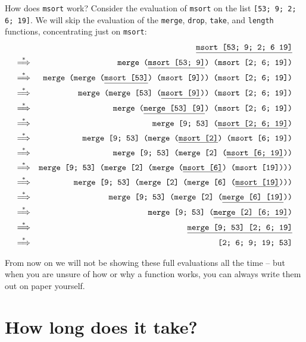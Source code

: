 \documentclass[]{book}
\begin{document}
How does \texttt{msort} work? Consider the evaluation of \texttt{msort} on the list \texttt{[53; 9; 2; 6; 19]}. We will skip the evaluation of the \texttt{merge}, \texttt{drop}, \texttt{take}, and \texttt{length} functions, concentrating just on \texttt{msort}:
\begin{eqnarray*}
 & & \underline{\texttt{msort [53; 9; 2; 6 19]\vphantom{g}}} \\
 \overset{*}\Longrightarrow & & \texttt{merge (\underline{msort [53; 9]\vphantom{g}}) (msort [2; 6; 19])} \\
 \overset{*}\Longrightarrow & & \texttt{merge (merge (\underline{msort [53]\vphantom{g}}) (msort [9])) (msort [2; 6; 19])} \\
\overset{*}\Longrightarrow & & \texttt{merge (merge [53] (\underline{msort [9]\vphantom{g}})) (msort [2; 6; 19])} \\
\overset{*}\Longrightarrow & & \texttt{merge (\underline{merge [53] [9]}) (msort [2; 6; 19])} \\
\overset{*}\Longrightarrow & & \texttt{merge [9; 53] (\underline{msort [2; 6; 19]})} \\
\overset{*}\Longrightarrow & & \texttt{merge [9; 53] (merge (\underline{msort [2]}) (msort [6; 19])} \\
\overset{*}\Longrightarrow & & \texttt{merge [9; 53] (merge [2] (\underline{msort [6; 19]}))} \\
\overset{*}\Longrightarrow & & \texttt{merge [9; 53] (merge [2] (merge (\underline{msort [6]}) (msort [19])))} \\
\overset{*}\Longrightarrow & & \texttt{merge [9; 53] (merge [2] (merge [6] (\underline{msort [19]})))} \\
\overset{*}\Longrightarrow & & \texttt{merge [9; 53] (merge [2] (\underline{merge [6] [19]}))} \\
\overset{*}\Longrightarrow & & \texttt{merge [9; 53] (\underline{merge [2] [6; 19]})} \\
\overset{*}\Longrightarrow & & \texttt{\underline{merge [9; 53] [2; 6; 19]}} \\
\overset{*}\Longrightarrow & & \texttt{[2; 6; 9; 19; 53]}
\end{eqnarray*}

\noindent From now on we will not be showing these full evaluations all the time -- but when you are unsure of how or why a function works, you can always write them out on paper yourself.

\section*{How long does it take?}
\end{document}
